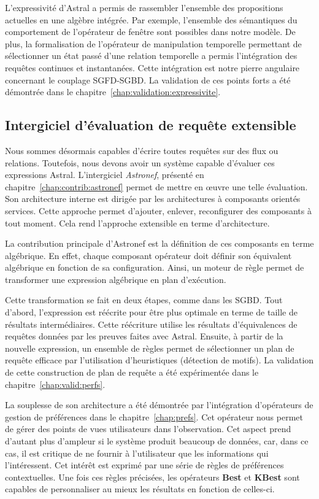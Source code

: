 L'expressivité d'Astral a permis de rassembler l'ensemble des propositions actuelles en une algèbre intégrée. Par exemple, l'ensemble des sémantiques du comportement de l'opérateur de fenêtre sont possibles dans notre modèle. De plus, la formalisation de l'opérateur de manipulation temporelle permettant de sélectionner un état passé d'une relation temporelle a permis l'intégration des requêtes continues et instantanées. Cette intégration est notre pierre angulaire concernant le couplage SGFD-SGBD. La validation de ces points forts a été démontrée dans le chapitre~\ref{chap:validation:expressivite}.

\subsection{Intergiciel d'évaluation de requête extensible}
Nous sommes désormais capables d'écrire toutes requêtes sur des flux ou relations. Toutefois, nous devons avoir un système capable d'évaluer ces expressions Astral. L'intergiciel \textit{Astronef}, présenté en chapitre~\ref{chap:contrib:astronef} permet de mettre en œuvre une telle évaluation. Son architecture interne est dirigée par les architectures à composants orientés services. Cette approche permet d’ajouter, enlever, reconfigurer des composants à tout moment. Cela rend l'approche extensible en terme d'architecture.

La contribution principale d'Astronef est la définition de ces composants en terme algébrique. En effet, chaque composant opérateur doit définir son équivalent algébrique en fonction de sa configuration. Ainsi, un moteur de règle permet de transformer une expression algébrique en plan d'exécution.

Cette transformation se fait en deux étapes, comme dans les SGBD. Tout d'abord, l'expression est réécrite pour être plus optimale en terme de taille de résultats intermédiaires. Cette réécriture utilise les résultats d'équivalences de requêtes données par les preuves faites avec Astral. Ensuite, à partir de la nouvelle expression, un ensemble de règles permet de sélectionner un plan de requête efficace par l'utilisation d'heuristiques (détection de motifs). La validation de cette construction de plan de requête a été expérimentée dans le chapitre~\ref{chap:valid:perfs}. 

La souplesse de son architecture a été démontrée par l'intégration d'opérateurs de gestion de préférences dans le chapitre~\ref{chap:prefs}. Cet opérateur nous permet de gérer des points de vues utilisateurs dans l'observation. Cet aspect prend d'autant plus d'ampleur si le système produit beaucoup de données, car, dans ce cas, il est critique de ne fournir à l'utilisateur que les informations qui l'intéressent. Cet intérêt est exprimé par une série de règles de préférences contextuelles. Une fois ces règles précisées, les opérateurs \textbf{Best} et \textbf{KBest} sont capables de personnaliser au mieux les résultats en fonction de celles-ci.

